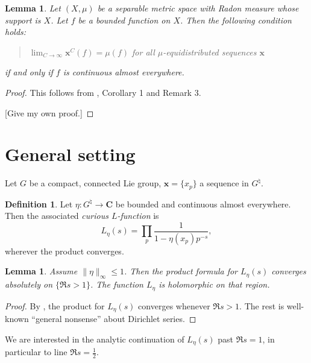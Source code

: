 \documentclass{article}
\newcommand{\bC}{\mathbf{C}}
\newcommand{\bx}{\boldsymbol{x}}
\newtheorem{lemma}[subsection]{Lemma}
\theoremstyle{definition}
\newtheorem{definition}[subsection]{Definition}
\begin{document}
\begin{lemma}\label{debruijn-post}
Let $(X,\mu)$ be a separable metric space with Radon measure whose support is 
$X$. Let $f$ be a bounded function on $X$. Then the following condition holds:
\begin{quote}
$\lim_{C\to \infty} \bx^C(f) = \mu(f)$ for all $\mu$-equidistributed sequences $\bx$
\end{quote}
if and only if $f$ is continuous almost everywhere.
\end{lemma}
\begin{proof}
This follows from \cite{chersi-volcic-1992}, Corollary 1 and Remark 3. 

[Give my own proof.]
\end{proof}





\section{General setting}

Let $G$ be a compact, connected Lie group, $\bx=\{x_p\}$ a sequence in 
$G^\natural$. 

\begin{definition}
Let $\eta\colon G^\natural \to \bC$ be bounded and continuous almost 
everywhere. Then the associated \emph{curious $L$-function} is 
\[
	L_\eta(s) = \prod_p \frac{1}{1-\eta(x_p) p^{-s}} ,
\]
wherever the product converges. 
\end{definition}

\begin{lemma}
Assume $\|\eta\|_\infty \leqslant 1$. Then the product formula for 
$L_\eta(s)$ converges absolutely on $\{\Re s>1\}$. The function $L_\eta$ is 
holomorphic on that region. 
\end{lemma}
\begin{proof}
By \cite[\S3.7, Th.~5]{knopp-1956}, the product for $L_\eta(s)$ converges 
whenever $\Re s>1$. The rest is well-known ``general nonsense'' about Dirichlet 
series. 
\end{proof}

We are interested in the analytic continuation of $L_\eta(s)$ past $\Re s=1$, 
in particular to line $\Re s=\frac 1 2$. 
\end{document}
